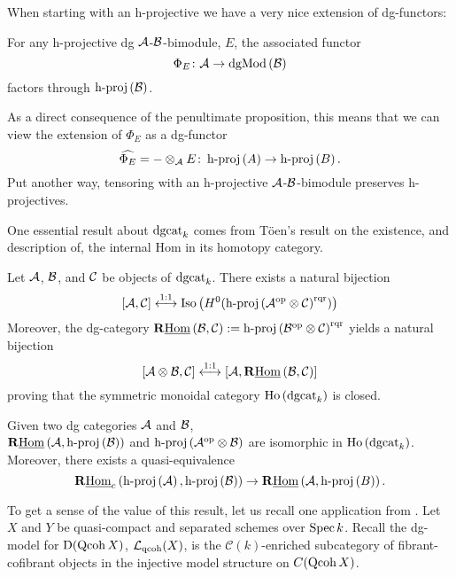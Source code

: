 When starting with an h-projective we have a very nice extension of dg-functors:
\begin{proposition}[{\cite[Lemma 3.4]{CS15}}]
  For any h-projective dg \(\A\)-\(\B\)-bimodule, \(E\), the associated functor
  \[\Phi_E \colon \A \to \dgMod{\B}\]
  factors through \(\hproj{\B}\).
\end{proposition}

As a direct consequence of the penultimate proposition, this means that we can view the extension of \(\Phi_E\) as a dg-functor
\[\widehat{\Phi_E} = - \otimes_\A E \colon \hproj{A} \to \hproj{B}.\]
Put another way, tensoring with an h-projective \(\A\)-\(\B\)-bimodule preserves h-projectives.

One essential result about \(\dgcat{k}\) comes from T\"oen's result on the existence, and description of, the internal Hom in its homotopy category. 

\begin{theorem} \label{theorem: Toen}
  Let \(\A\), \(\B\), and \(\C\) be objects of \(\dgcat{k}\).
  There exists a natural bijection
  \[[\A,\C] \overset{1:1}\longleftrightarrow \Iso{H^0(\hproj{\A^{\opp} \otimes \C}^\rqr)}\]
  Moreover, the dg-category \(\RHom{\B,\C} := \hproj{\B^\opp \otimes \C}^\rqr\) yields a natural bijection
  \[[\A \otimes \B, \C] \overset{1:1}\longleftrightarrow [\A, \RHom{\B,\C}]\]
  proving that the symmetric monoidal category \(\Ho{\dgcat{k}}\) is closed.
\end{theorem}

\begin{corollary} \label{corollary: Toen}
  Given two dg categories \(\A\) and \(\B\), \\\(\RHom{\A, \hproj{\B}}\) and \(\hproj{\A^\opp \otimes \B}\) are isomorphic in \(\Ho{\dgcat{k}}\).
  Moreover, there exists a quasi-equivalence
  \[\RHomc{\hproj{\A},\hproj{\B}} \to \RHom{\A, \hproj{B}}.\]
\end{corollary}

To get a sense of the value of this result, let us recall one application from \cite[Section 8.3]{Toen07}. Let \(X\) and \(Y\) be quasi-compact and separated schemes over \(\op{Spec} k\). 
Recall the dg-model for \(\mathrm{D}(\op{Qcoh} X)\), \(\mathcal L_{\op{qcoh}}(X)\), is the \(\mathcal C(k)\)-enriched subcategory of fibrant-cofibrant objects in the injective model structure on \(C(\op{Qcoh} X)\).

